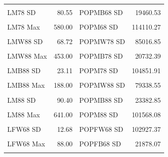 \documentclass[
  12pt,
]{article}
\begin{document}
\begin{longtable}{lrlr}
\addlinespace
\cellcolor{gray!10}{LM78 Media} & \cellcolor{gray!10}{40.83} & \cellcolor{gray!10}{POPMB68 Media} & \cellcolor{gray!10}{5329.95}\\
LM78 SD & 80.55 & POPMB68 SD & 19460.53\\
\cellcolor{gray!10}{LM78 Min} & \cellcolor{gray!10}{3.00} & \cellcolor{gray!10}{POPM68 Media} & \cellcolor{gray!10}{58313.77}\\
LM78 Max & 580.00 & POPM68 SD & 114110.27\\
\cellcolor{gray!10}{LMW88 Media} & \cellcolor{gray!10}{43.01} & \cellcolor{gray!10}{POPMW78 Media} & \cellcolor{gray!10}{53411.91}\\
\addlinespace
LMW88 SD & 68.72 & POPMW78 SD & 85016.85\\
\cellcolor{gray!10}{LMW88 Min} & \cellcolor{gray!10}{2.00} & \cellcolor{gray!10}{POPMB78 Media} & \cellcolor{gray!10}{5915.57}\\
LMW88 Max & 453.00 & POPMB78 SD & 20732.39\\
\cellcolor{gray!10}{LMB88 Media} & \cellcolor{gray!10}{6.22} & \cellcolor{gray!10}{POPM78 Media} & \cellcolor{gray!10}{59327.48}\\
LMB88 SD & 23.11 & POPM78 SD & 104851.91\\
\addlinespace
\cellcolor{gray!10}{LMB88 Min} & \cellcolor{gray!10}{0.00} & \cellcolor{gray!10}{POPMW88 Media} & \cellcolor{gray!10}{52407.83}\\
LMB88 Max & 188.00 & POPMW88 SD & 79338.55\\
\cellcolor{gray!10}{LM88 Media} & \cellcolor{gray!10}{49.23} & \cellcolor{gray!10}{POPMB88 Media} & \cellcolor{gray!10}{6799.70}\\
LM88 SD & 90.40 & POPMB88 SD & 23382.85\\
\cellcolor{gray!10}{LM88 Min} & \cellcolor{gray!10}{2.00} & \cellcolor{gray!10}{POPM88 Media} & \cellcolor{gray!10}{59207.53}\\
\addlinespace
LM88 Max & 641.00 & POPM88 SD & 101568.08\\
\cellcolor{gray!10}{LFW68 Media} & \cellcolor{gray!10}{6.12} & \cellcolor{gray!10}{POPFW68 Media} & \cellcolor{gray!10}{56094.52}\\
LFW68 SD & 12.68 & POPFW68 SD & 102927.37\\
\cellcolor{gray!10}{LFW68 Min} & \cellcolor{gray!10}{0.00} & \cellcolor{gray!10}{POPFB68 Media} & \cellcolor{gray!10}{5862.83}\\
LFW68 Max & 88.00 & POPFB68 SD & 21878.07\\
\addlinespace

\end{longtable}
\end{document}
